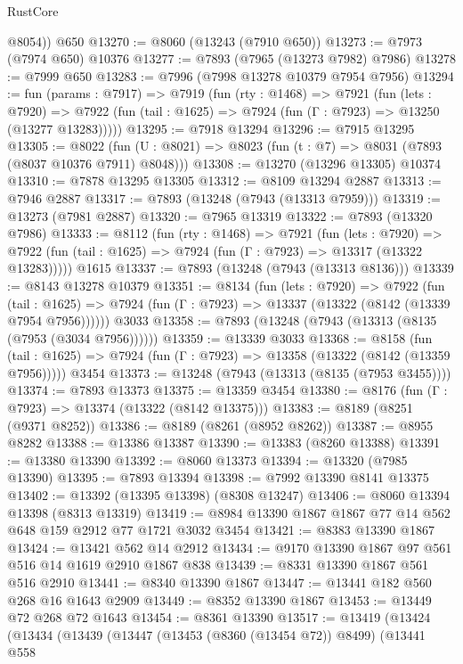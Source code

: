 \begin{lexlean}{RustCore}
\begin{coremodule}
        @8054))
    @650
@13270 := @8060 (@13243 (@7910 @650))
@13273 := @7973 (@7974 @650) @10376
@13277 := @7893 (@7965 (@13273 @7982) @7986)
@13278 := @7999 @650
@13283 := @7996 (@7998 @13278 @10379 @7954 @7956)
@13294 := fun (params : @7917) =>
  @7919
    (fun (rty : @1468) =>
    @7921
      (fun (lets : @7920) =>
      @7922 (fun (tail : @1625) => @7924 (fun (Γ : @7923) => @13250 (@13277 @13283)))))
@13295 := @7918 @13294
@13296 := @7915 @13295
@13305 := @8022
    (fun (U : @8021) => @8023 (fun (t : @7) => @8031 (@7893 (@8037 @10376 @7911) @8048)))
@13308 := @13270 (@13296 @13305) @10374
@13310 := @7878 @13295 @13305
@13312 := @8109 @13294 @2887
@13313 := @7946 @2887
@13317 := @7893 (@13248 (@7943 (@13313 @7959)))
@13319 := @13273 (@7981 @2887)
@13320 := @7965 @13319
@13322 := @7893 (@13320 @7986)
@13333 := @8112
    (fun (rty : @1468) =>
    @7921
      (fun (lets : @7920) =>
      @7922 (fun (tail : @1625) => @7924 (fun (Γ : @7923) => @13317 (@13322 @13283)))))
    @1615
@13337 := @7893 (@13248 (@7943 (@13313 @8136)))
@13339 := @8143 @13278 @10379
@13351 := @8134
    (fun (lets : @7920) =>
    @7922
      (fun (tail : @1625) =>
      @7924 (fun (Γ : @7923) => @13337 (@13322 (@8142 (@13339 @7954 @7956))))))
    @3033
@13358 := @7893 (@13248 (@7943 (@13313 (@8135 (@7953 (@3034 @7956))))))
@13359 := @13339 @3033
@13368 := @8158
    (fun (tail : @1625) => @7924 (fun (Γ : @7923) => @13358 (@13322 (@8142 (@13359 @7956)))))
    @3454
@13373 := @13248 (@7943 (@13313 (@8135 (@7953 @3455))))
@13374 := @7893 @13373
@13375 := @13359 @3454
@13380 := @8176 (fun (Γ : @7923) => @13374 (@13322 (@8142 @13375)))
@13383 := @8189 (@8251 (@9371 @8252))
@13386 := @8189 (@8261 (@8952 @8262))
@13387 := @8955 @8282
@13388 := @13386 @13387
@13390 := @13383 (@8260 @13388)
@13391 := @13380 @13390
@13392 := @8060 @13373
@13394 := @13320 (@7985 @13390)
@13395 := @7893 @13394
@13398 := @7992 @13390 @8141 @13375
@13402 := @13392 (@13395 @13398) (@8308 @13247)
@13406 := @8060 @13394 @13398 (@8313 @13319)
@13419 := @8984 @13390 @1867 @1867 @77 @14 @562 @648 @159 @2912 @77 @1721 @3032 @3454
@13421 := @8383 @13390 @1867
@13424 := @13421 @562 @14 @2912
@13434 := @9170 @13390 @1867 @97 @561 @516 @14 @1619 @2910 @1867 @838
@13439 := @8331 @13390 @1867 @561 @516 @2910
@13441 := @8340 @13390 @1867
@13447 := @13441 @182 @560 @268 @16 @1643 @2909
@13449 := @8352 @13390 @1867
@13453 := @13449 @72 @268 @72 @1643
@13454 := @8361 @13390
@13517 := @13419
    (@13424
      (@13434
        (@13439
          (@13447
            (@13453 (@8360 (@13454 @72)) @8499)
            (@13441
              @558

\end{coremodule}
\end{lexlean}
